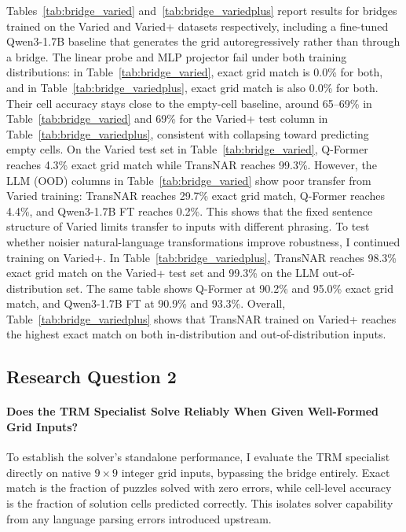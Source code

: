 \documentclass[11pt]{article}
\begin{document}
Tables~\ref{tab:bridge_varied} and~\ref{tab:bridge_variedplus} report results for bridges trained on the Varied and Varied+ datasets respectively, including a fine-tuned Qwen3-1.7B baseline that generates the grid autoregressively rather than through a bridge.
The linear probe and MLP projector fail under both training distributions: in Table~\ref{tab:bridge_varied}, exact grid match is 0.0\% for both, and in Table~\ref{tab:bridge_variedplus}, exact grid match is also 0.0\% for both.
Their cell accuracy stays close to the empty-cell baseline, around 65--69\% in Table~\ref{tab:bridge_varied} and 69\% for the Varied+ test column in Table~\ref{tab:bridge_variedplus}, consistent with collapsing toward predicting empty cells.
On the Varied test set in Table~\ref{tab:bridge_varied}, Q-Former reaches 4.3\% exact grid match while TransNAR reaches 99.3\%.
However, the LLM (OOD) columns in Table~\ref{tab:bridge_varied} show poor transfer from Varied training: TransNAR reaches 29.7\% exact grid match, Q-Former reaches 4.4\%, and Qwen3-1.7B FT reaches 0.2\%.
This shows that the fixed sentence structure of Varied limits transfer to inputs with different phrasing.
To test whether noisier natural-language transformations improve robustness, I continued training on Varied+.
In Table~\ref{tab:bridge_variedplus}, TransNAR reaches 98.3\% exact grid match on the Varied+ test set and 99.3\% on the LLM out-of-distribution set.
The same table shows Q-Former at 90.2\% and 95.0\% exact grid match, and Qwen3-1.7B FT at 90.9\% and 93.3\%.
Overall, Table~\ref{tab:bridge_variedplus} shows that TransNAR trained on Varied+ reaches the highest exact match on both in-distribution and out-of-distribution inputs.

\subsection*{Research Question 2}
\label{sec:standalone_trm_results}

\paragraph{Does the TRM Specialist Solve Reliably When Given Well-Formed Grid Inputs?}
To establish the solver's standalone performance, I evaluate the TRM specialist directly on native $9{\times}9$ integer grid inputs, bypassing the bridge entirely.
Exact match is the fraction of puzzles solved with zero errors, while cell-level accuracy is the fraction of solution cells predicted correctly.
This isolates solver capability from any language parsing errors introduced upstream.
\end{document}
